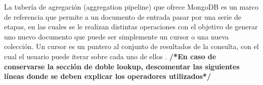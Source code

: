 \documentclass[conference,compsoc]{sty/IEEEtran}
\begin{document}
La tubería de agregación (aggregation pipeline) que ofrece MongoDB es un marco de referencia que permite a un documento de entrada pasar por una serie de etapas, en las cuales se le realizan distintas operaciones con el objetivo de generar uno nuevo documento que puede ser simplemente un cursor o una nueva colección. Un cursor es un puntero al conjunto de resultados de la consulta, con el cual el usuario puede iterar sobre cada uno de ellos \cite{aggregationMongo}.  %
\textbf{/*En caso de conservarse la sección de doble lookup, descomentar las siguientes líneas donde se deben explicar los operadores utilizados*/}\par
\end{document}
